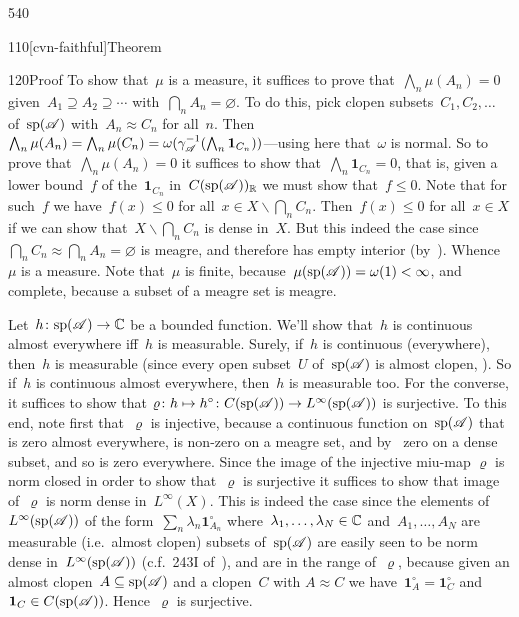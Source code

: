 \begin{parsec}{540}
\begin{point}{110}[cvn-faithful]{Theorem}
\begin{point}{120}{Proof}
To show that~$\mu$
is a measure,
it suffices to prove
that~$\bigwedge_n \mu(A_n)=0$
given~$A_1\supseteq A_2\supseteq \dotsb$
with~$\bigcap_n A_n=\varnothing$.
To do this, pick clopen subsets~$C_1,C_2,\dotsc$
of~$\mathrm{sp}(\mathscr{A})$
with~$A_n\approx C_n$ for all~$n$.
Then~$\bigwedge_n \mu(A_n)
=\bigwedge_n \mu(C_n)
= \omega(\gamma_{\mathscr{A}}^{-1}(\bigwedge_n \mathbf{1}_{C_n}))$---using 
here that~$\omega$ is normal.
So to prove that~$\bigwedge_n \mu(A_n)=0$
it suffices to show that~$\bigwedge_n \mathbf{1}_{C_n}=0$,
that is,
given a lower bound~$f$ of the~$\mathbf{1}_{C_n}$
in~$C(\mathrm{sp}(\mathscr{A}))_{\mathbb{R}}$
we must show that~$f\leq 0$.
Note that for such~$f$
we have~$f(x)\leq 0$
for all~$x\in X\backslash\bigcap_n C_n$.
Then~$f(x)\leq 0$ for all~$x\in X$
if we can show that~$X\backslash \bigcap_n C_n$ is dense in~$X$.
But this indeed the case
since~$\bigcap_n C_n\approx \bigcap_n A_n=\varnothing$
is meagre, and therefore has empty interior
(by~).
Whence~$\mu$ is a measure.
Note that~$\mu$ is finite,
because~$\mu(\mathrm{sp}(\mathscr{A}))
= \omega(1)<\infty$,
and complete,
because a subset of a meagre set is meagre.

Let~$h\colon \mathrm{sp}(\mathscr{A})\to\mathbb{C}$ be a bounded function.
We'll show that~$h$ is continuous almost everywhere
iff~$h$ is measurable.
Surely,
if~$h$ is continuous (everywhere),
then~$h$ is measurable
(since every open subset~$U$ of~$\mathrm{sp}(\mathscr{A})$
is almost clopen, ).
So if~$h$ is continuous almost everywhere,
then~$h$ is measurable too.
For the converse,
it suffices to show
that $\varrho \colon h\mapsto h^\circ\colon C(\mathrm{sp}(\mathscr{A}))\to
L^\infty(\mathrm{sp}(\mathscr{A}))$ is surjective.
To this end, note first that~$\varrho$ is injective,
because a continuous function on~$\mathrm{sp}(\mathscr{A})$
that is zero almost everywhere,
is non-zero on a meagre set,
and by~ zero on a dense
subset, and so is zero everywhere.
Since the image of the injective miu-map $\varrho$ is norm closed
in order to show that~$\varrho$ is surjective
it suffices to show that image of~$\varrho$ is 
norm dense in~$L^\infty(X)$.
This is indeed the case
since the elements of~$L^\infty(\mathrm{sp}(\mathscr{A}))$
of the form~$\sum_{n} \lambda_n \mathbf{1}_{A_n}^\circ$
where~$\lambda_1,\dotsc,\lambda_N\in\mathbb{C}$
and~$A_1,\dotsc,A_N$ are measurable (i.e.~almost clopen)
subsets of~$\mathrm{sp}(\mathscr{A})$
are easily seen to be norm dense in~$L^\infty(\mathrm{sp}(\mathscr{A}))$
(c.f.~243I of~\cite{fremlin}),
and are in the range of~$\varrho$,
because given an almost clopen~$A\subseteq \mathrm{sp}(\mathscr{A})$
and a clopen~$C$ with $A\approx C$
we have~$\mathbf{1}_A^\circ = \mathbf{1}_C^\circ$
and~$\mathbf{1}_{C}\in C(\mathrm{sp}(\mathscr{A}))$.
Hence~$\varrho$ is surjective.


\end{point}
\end{point}
\end{parsec}
